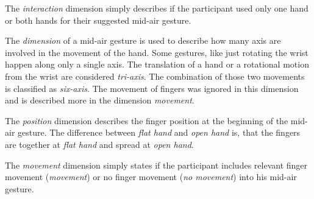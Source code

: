 \documentclass[sigchi]{acmart}
\begin{document}
	The \textit{interaction} dimension simply describes if the participant used only one hand or both hands for their suggested mid-air gesture.
	
	The \textit{dimension} of a mid-air gesture is used to describe how many axis are involved in the movement of the hand. Some gestures, like just rotating the wrist happen along only a single axis. The translation of a hand or a rotational motion from the wrist are considered \textit{tri-axis}. The combination of those two movements is classified as \textit{six-axis}. The movement of fingers was ignored in this dimension and is described more in the dimension \textit{movement}.
	
	The \textit{position} dimension describes the finger position at the beginning of the mid-air gesture. The difference between \textit{flat hand} and \textit{open hand} is, that the fingers are together at \textit{flat hand} and spread at \textit{open hand}.
	
	The \textit{movement} dimension simply states if the participant includes relevant finger movement (\textit{movement}) or no finger movement (\textit{no movement}) into his mid-air gesture. 
	
\end{document}
